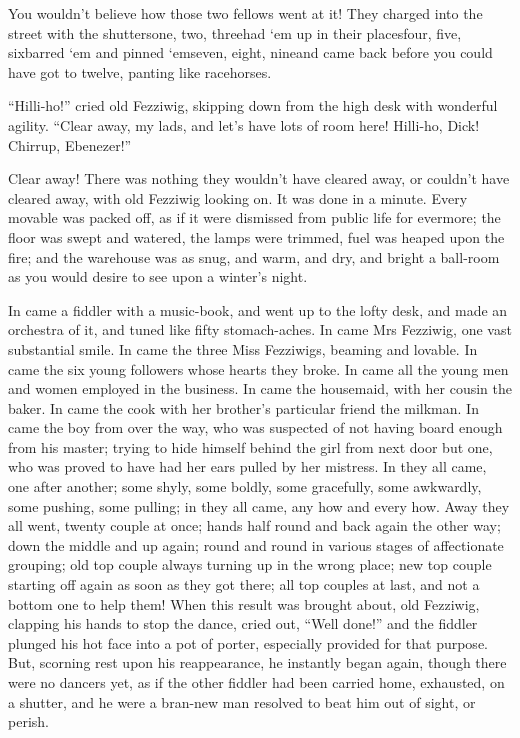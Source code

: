 \documentclass[paper=5.5in:8.5in,BCOR=10mm,twoside,DIV=15,12pt,usegeometry,openany]{scrbook} %
\begin{document}
You wouldn't believe how those two fellows went at it! They charged into the street with the shutters\textemdash one, two, three\textemdash had `em up in their places\textemdash four, five, six\textemdash barred `em and pinned `em\textemdash seven, eight, nine\textemdash and came back before you could have got to twelve, panting like racehorses.

\enquote{Hilli-ho!} cried old Fezziwig, skipping down from the high desk with wonderful agility. \enquote{Clear away, my lads, and let's have lots of room here! Hilli-ho, Dick! Chirrup, Ebenezer!}

Clear away! There was nothing they wouldn't have cleared away, or couldn't have cleared away, with old Fezziwig looking on. It was done in a minute. Every movable was packed off, as if it were dismissed from public life for evermore; the floor was swept and watered, the lamps were trimmed, fuel was heaped upon the fire; and the warehouse was as snug, and warm, and dry, and bright a ball-room as you would desire to see upon a winter's night.

In came a fiddler with a music-book, and went up to the lofty desk, and made an orchestra of it, and tuned like fifty stomach-aches. In came Mrs Fezziwig, one vast substantial smile. In came the three Miss Fezziwigs, beaming and lovable. In came the six young followers whose hearts they broke. In came all the young men and women employed in the business. In came the housemaid, with her cousin the baker. In came the cook with her brother's particular friend the milkman. In came the boy from over the way, who was suspected of not having board enough from his master; trying to hide himself behind the girl from next door but one, who was proved to have had her ears pulled by her mistress. In they all came, one after another; some shyly, some boldly, some gracefully, some awkwardly, some pushing, some pulling; in they all came, any how and every how. Away they all went, twenty couple at once; hands half round and back again the other way; down the middle and up again; round and round in various stages of affectionate grouping; old top couple always turning up in the wrong place; new top couple starting off again as soon as they got there; all top couples at last, and not a bottom one to help them! When this result was brought about, old Fezziwig, clapping his hands to stop the dance, cried out, \enquote{Well done!} and the fiddler plunged his hot face into a pot of porter, especially provided for that purpose. But, scorning rest upon his reappearance, he instantly began again, though there were no dancers yet, as if the other fiddler had been carried home, exhausted, on a shutter, and he were a bran-new man resolved to beat him out of sight, or perish.
\end{document}
